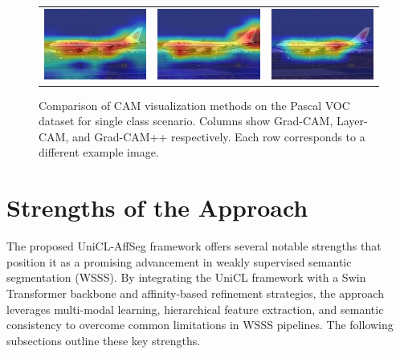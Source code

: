 \begin{figure}[!t]
\begin{center}
{\begin{tabular}{c c c}
        \includegraphics[width=0.18\linewidth, height=0.18\linewidth]{figures/cams/gradcam/2008_003976_0} &
        \includegraphics[width=0.18\linewidth, height=0.18\linewidth]{figures/cams/layercam/2008_003976_0} &
        \includegraphics[width=0.18\linewidth, height=0.18\linewidth]{figures/cams/gradcampp/2008_003976_0} \\

      \end{tabular}
    }
  \end{center}

  \caption{Comparison of CAM visualization methods on the Pascal VOC dataset for single class scenario. Columns show Grad-CAM, Layer-CAM, and Grad-CAM++ respectively. Each row corresponds to a different example image.}
  \label{fig:cam_variation_singleclass}
\end{figure}


\section{Strengths of the Approach}
\label{sec:strengths_of_approach}

The proposed UniCL-AffSeg framework offers several notable strengths that position it as a promising advancement in weakly supervised semantic segmentation (WSSS). By integrating the UniCL framework with a Swin Transformer backbone and affinity-based refinement strategies, the approach leverages multi-modal learning, hierarchical feature extraction, and semantic consistency to overcome common limitations in WSSS pipelines. The following subsections outline these key strengths.

